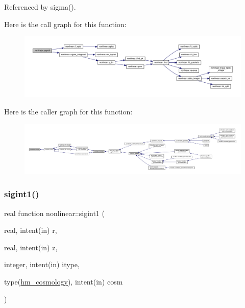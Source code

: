 Referenced by sigma().

Here is the call graph for this function\+:
\nopagebreak
\begin{figure}[H]
\begin{center}
\leavevmode
\includegraphics[width=350pt]{namespacenonlinear_ad4ec869211d722d92d942360f0619e6e_cgraph}
\end{center}
\end{figure}
Here is the caller graph for this function\+:
\nopagebreak
\begin{figure}[H]
\begin{center}
\leavevmode
\includegraphics[width=350pt]{namespacenonlinear_ad4ec869211d722d92d942360f0619e6e_icgraph}
\end{center}
\end{figure}
\mbox{\label{namespacenonlinear_ac0dc62ceea1e6ba2e1b7a08a420d934e}} 
\subsubsection{\texorpdfstring{sigint1()}{sigint1()}}
{\footnotesize\ttfamily real function nonlinear\+::sigint1 (\begin{DoxyParamCaption}\item[{real, intent(in)}]{r,  }\item[{real, intent(in)}]{z,  }\item[{integer, intent(in)}]{itype,  }\item[{type(\mbox{\hyperlink{structnonlinear_1_1hm__cosmology}{hm\+\_\+cosmology}}), intent(in)}]{cosm }\end{DoxyParamCaption})\hspace{0.3cm}{\ttfamily [private]}}



